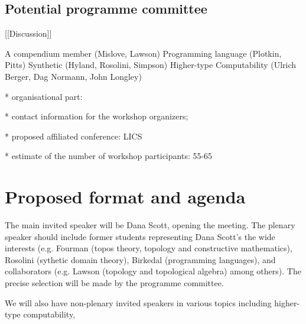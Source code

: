 \documentclass{article}
\begin{document}
\subsection{Potential programme committee}

[[Discussion]]

A compendium member (Mislove, Lawson)
Programming language (Plotkin, Pitts)
Synthetic (Hyland, Rosolini, Simpson)
Higher-type Computability (Ulrich Berger, Dag Normann, John Longley)

* organisational part:

*        contact information for the workshop organizers;

*        proposed affiliated conference: LICS


* estimate of the number of workshop participants: 55-65

\section{Proposed format and agenda}

The main invited speaker will be Dana Scott, opening the meeting.
The plenary speaker should include former students representing Dana Scott's the wide interests (e.g. Fourman (topos theory, topology and constructive mathematics), Rosolini (sythetic domain theory), Birkedal (programming languages), and collaborators (e.g. Lawson (topology and topological algebra) among others). The precise selection will be made by the programme committee.

We will also have non-plenary invited speakers in various topics including higher-type computability,
\end{document}
